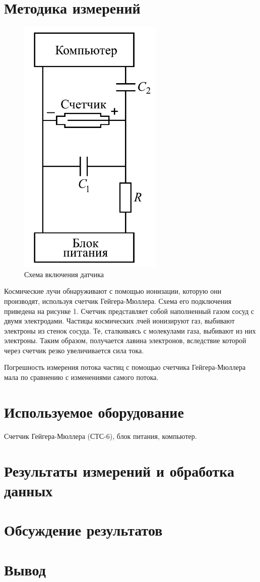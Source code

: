 \documentclass[a4paper, 12pt]{article}
\begin{document}
 	\section{Методика измерений}
	\begin{figure}[H]
		\centering
		\includegraphics[scale = 0.5]{pictures/scheme.png}
		\caption{Схема включения датчика}
	\end{figure}
	
	Космические лучи обнаруживают с помощью ионизации, которую они производят, используя счетчик Гейгера-Мюллера. Схема его подключения приведена на рисунке 1. Счетчик представляет собой наполненный газом сосуд с двумя электродами. Частицы космических лчей ионизируют газ, выбивают электроны из стенок сосуда. Те, сталкиваясь с молекулами газа, выбивают из них электроны. Таким образом, получается лавина электронов, вследствие которой через счетчик резко увеличивается сила тока.

Погрешность измерения потока частиц с помощью счетчика Гейгера-Мюллера мала по сравнению с изменениями самого потока.
	\section{Используемое оборудование}
	Счетчик Гейгера-Мюллера (СТС-6), блок питания, компьютер.
	\section{Результаты измерений и обработка данных}
	\section{Обсуждение результатов}
	\section{Вывод}
\end{document}
